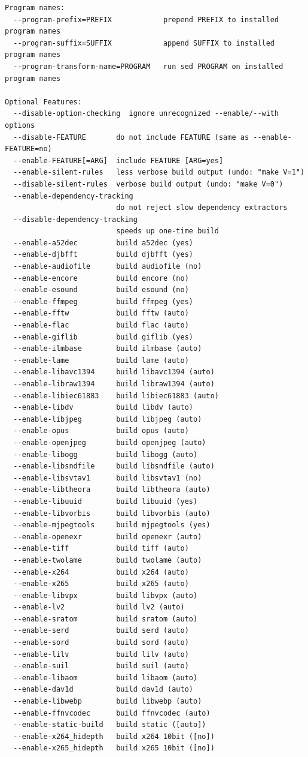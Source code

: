 \begin{verbatim}
Program names:
  --program-prefix=PREFIX            prepend PREFIX to installed program names
  --program-suffix=SUFFIX            append SUFFIX to installed program names
  --program-transform-name=PROGRAM   run sed PROGRAM on installed program names

Optional Features:
  --disable-option-checking  ignore unrecognized --enable/--with options
  --disable-FEATURE       do not include FEATURE (same as --enable-FEATURE=no)
  --enable-FEATURE[=ARG]  include FEATURE [ARG=yes]
  --enable-silent-rules   less verbose build output (undo: "make V=1")
  --disable-silent-rules  verbose build output (undo: "make V=0")
  --enable-dependency-tracking
                          do not reject slow dependency extractors
  --disable-dependency-tracking
                          speeds up one-time build
  --enable-a52dec         build a52dec (yes)
  --enable-djbfft         build djbfft (yes)
  --enable-audiofile      build audiofile (no)
  --enable-encore         build encore (no)
  --enable-esound         build esound (no)
  --enable-ffmpeg         build ffmpeg (yes)
  --enable-fftw           build fftw (auto)
  --enable-flac           build flac (auto)
  --enable-giflib         build giflib (yes)
  --enable-ilmbase        build ilmbase (auto)
  --enable-lame           build lame (auto)
  --enable-libavc1394     build libavc1394 (auto)
  --enable-libraw1394     build libraw1394 (auto)
  --enable-libiec61883    build libiec61883 (auto)
  --enable-libdv          build libdv (auto)
  --enable-libjpeg        build libjpeg (auto)
  --enable-opus           build opus (auto)
  --enable-openjpeg       build openjpeg (auto)
  --enable-libogg         build libogg (auto)
  --enable-libsndfile     build libsndfile (auto)
  --enable-libsvtav1      build libsvtav1 (no)
  --enable-libtheora      build libtheora (auto)
  --enable-libuuid        build libuuid (yes)
  --enable-libvorbis      build libvorbis (auto)
  --enable-mjpegtools     build mjpegtools (yes)
  --enable-openexr        build openexr (auto)
  --enable-tiff           build tiff (auto)
  --enable-twolame        build twolame (auto)
  --enable-x264           build x264 (auto)
  --enable-x265           build x265 (auto)
  --enable-libvpx         build libvpx (auto)
  --enable-lv2            build lv2 (auto)
  --enable-sratom         build sratom (auto)
  --enable-serd           build serd (auto)
  --enable-sord           build sord (auto)
  --enable-lilv           build lilv (auto)
  --enable-suil           build suil (auto)
  --enable-libaom         build libaom (auto)
  --enable-dav1d          build dav1d (auto)
  --enable-libwebp        build libwebp (auto)
  --enable-ffnvcodec      build ffnvcodec (auto)
  --enable-static-build   build static ([auto])
  --enable-x264_hidepth   build x264 10bit ([no])
  --enable-x265_hidepth   build x265 10bit ([no])


\end{verbatim}
